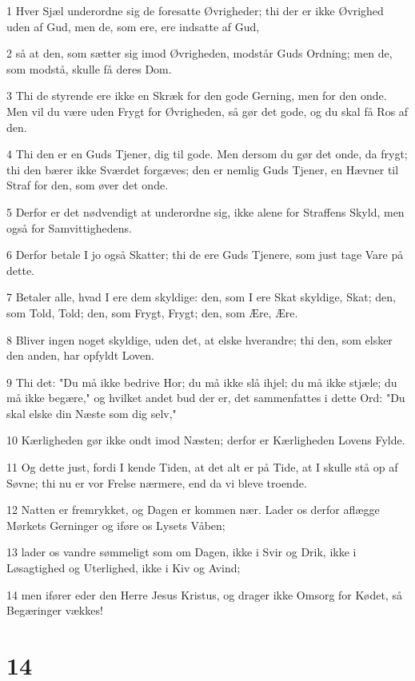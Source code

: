 \par 1 Hver Sjæl underordne sig de foresatte Øvrigheder; thi der er ikke Øvrighed uden af Gud, men de, som ere, ere indsatte af Gud,
\par 2 så at den, som sætter sig imod Øvrigheden, modstår Guds Ordning; men de, som modstå, skulle få deres Dom.
\par 3 Thi de styrende ere ikke en Skræk for den gode Gerning, men for den onde. Men vil du være uden Frygt for Øvrigheden, så gør det gode, og du skal få Ros af den.
\par 4 Thi den er en Guds Tjener, dig til gode. Men dersom du gør det onde, da frygt; thi den bærer ikke Sværdet forgæves; den er nemlig Guds Tjener, en Hævner til Straf for den, som øver det onde.
\par 5 Derfor er det nødvendigt at underordne sig, ikke alene for Straffens Skyld, men også for Samvittighedens.
\par 6 Derfor betale I jo også Skatter; thi de ere Guds Tjenere, som just tage Vare på dette.
\par 7 Betaler alle, hvad I ere dem skyldige: den, som I ere Skat skyldige, Skat; den, som Told, Told; den, som Frygt, Frygt; den, som Ære, Ære.
\par 8 Bliver ingen noget skyldige, uden det, at elske hverandre; thi den, som elsker den anden, har opfyldt Loven.
\par 9 Thi det: "Du må ikke bedrive Hor; du må ikke slå ihjel; du må ikke stjæle; du må ikke begære," og hvilket andet bud der er, det sammenfattes i dette Ord: "Du skal elske din Næste som dig selv,"
\par 10 Kærligheden gør ikke ondt imod Næsten; derfor er Kærligheden Lovens Fylde.
\par 11 Og dette just, fordi I kende Tiden, at det alt er på Tide, at I skulle stå op af Søvne; thi nu er vor Frelse nærmere, end da vi bleve troende.
\par 12 Natten er fremrykket, og Dagen er kommen nær. Lader os derfor aflægge Mørkets Gerninger og iføre os Lysets Våben;
\par 13 lader os vandre sømmeligt som om Dagen, ikke i Svir og Drik, ikke i Løsagtighed og Uterlighed, ikke i Kiv og Avind;
\par 14 men ifører eder den Herre Jesus Kristus, og drager ikke Omsorg for Kødet, så Begæringer vækkes!

\chapter{14}

